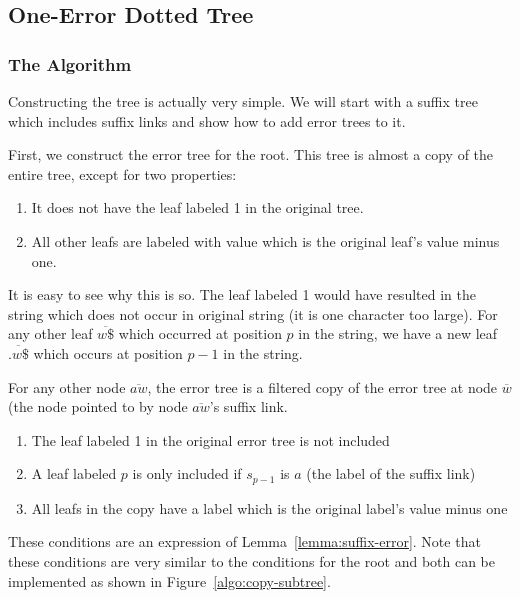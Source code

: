 \subsection{One-Error Dotted Tree}
\subsubsection{The Algorithm}

Constructing the tree is actually very simple. We will start with a suffix tree which includes suffix links and show how to add error trees to it.

First, we construct the error tree for the root. This tree is almost a copy of the entire tree, except for two properties:

\begin{enumerate}
\item It does not have the leaf labeled 1 in the original tree.
\item All other leafs are labeled with value which is the original leaf's value minus one.
\end{enumerate}

It is easy to see why this is so. The leaf labeled 1 would have resulted in the string  which does not occur in original string (it is one character too large). For any other leaf $\overline{w\$}$ which occurred at position $p$ in the string, we have a new leaf $\overline{.w\$}$ which occurs at position $p-1$ in the string.

For any other node $\overline{aw}$, the error tree is a filtered copy of the error tree at node $\overline{w}$ (the node pointed to by node $\overline{aw}$'s suffix link.

\begin{enumerate}
\item The leaf labeled 1 in the original error tree is not included
\item A leaf labeled $p$ is only included if $s_{p-1}$ is $a$ (the label of the suffix link)
\item All leafs in the copy have a label which is the original label's value minus one
\end{enumerate}

These conditions are an expression of Lemma~\ref{lemma:suffix-error}.
Note that these conditions are very similar to the conditions for the root and both can be implemented as shown in Figure~\ref{algo:copy-subtree}.



